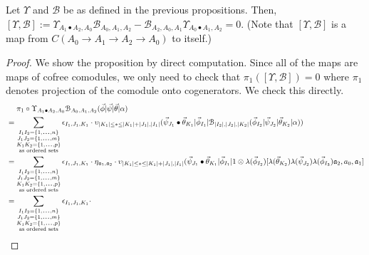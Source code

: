 \begin{prop}
\label{prop:c5}
Let $\Upsilon$ and $\mathcal{B}$ be as 
defined in the previous propositions. 
Then, $[\Upsilon, \mathcal{B}] := 
\Upsilon_{A_1\bullet A_2, A_0} 
\mathcal{B}_{A_0,A_1,A_2} - 
\mathcal{B}_{A_2, A_0, A_1} 
\Upsilon_{A_0 \bullet A_1, A_2} = 0$. 
(Note that $[\Upsilon, \mathcal{B}]$ is 
a map from $C(A_0 \to A_1 \to A_2 \to A_0)$ 
to itself.)
\end{prop}
%
\begin{proof}
We show the proposition by direct computation. 
Since all of the maps are maps of cofree 
comodules, we only need to check that 
$\pi_1([\Upsilon, \mathcal{B}]) = 0$ where 
$\pi_1$ denotes projection of the comodule 
onto cogenerators. We check this directly.
%
\begin{equation*}
\begin{aligned}
&\phantom{{}={}}
\pi_1 \circ \Upsilon_{A_1\bullet A_2, A_0} 
  \mathcal{B}_{A_0,A_1,A_2} 
  (\vec{\phi} | \vec{\psi} | \vec{\theta} | \alpha ) \\
&= 
\sum \limits_{\substack{
  I_1I_2 = \{1,\smdots,n\}\\
  J_1J_2 = \{1,\smdots,m\}\\
  K_1K_2 = \{1,\smdots,p\}\\
  \textrm{as ordered sets}}}
\epsilon_{I_1,J_1,K_1}\cdot
\upsilon_{|K_1| \leq * \leq |K_1|+|J_1|, |I_1|} (
   \vec{\psi}_{J_1} \bullet \vec{\theta}_{K_1} | 
   \vec{\phi}_{I_1} | 
   \mathcal{B}_{|I_2|, |J_2|, |K_2|} (
   \vec{\phi}_{I_2} | \vec{\psi}_{J_2} | \vec{\theta}_{K_2} | \alpha)) \\
&= 
\sum \limits_{\substack{
  I_1I_2 = \{1,\smdots,n\}\\
  J_1J_2 = \{1,\smdots,m\}\\
  K_1K_2 = \{1,\smdots,p\}\\
  \textrm{as ordered sets}}}
\epsilon_{I_1,J_1,K_1}\cdot
\eta_{\mathfrak{a}_1, \mathfrak{a}_2} \cdot
\upsilon_{|K_1| \leq * \leq |K_1|+|J_1|, |I_1|} (
   \vec{\psi}_{J_1} \bullet \vec{\theta}_{K_1} | 
   \vec{\phi}_{I_1} |
   1 \otimes \lambda(\vec{\phi}_{I_2})[
     \lambda(\vec{\theta}_{K_2}) \lambda(\vec{\psi}_{J_2}) 
     \lambda(\vec{\phi}_{I_3}) 
     \mathfrak{a}_2, a_0, \mathfrak{a}_1] \\
&= 
\sum \limits_{\substack{
  I_1I_2 = \{1,\smdots,n\}\\
  J_1J_2 = \{1,\smdots,m\}\\
  K_1K_2 = \{1,\smdots,p\}\\
  \textrm{as ordered sets}}}
\epsilon_{I_1,J_1,K_1}\cdot

\end{aligned}
\end{equation*}
\end{proof}
